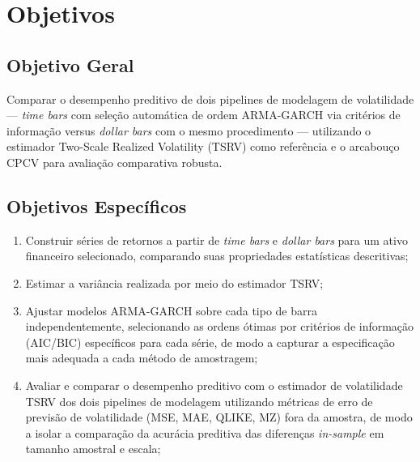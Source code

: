 \section{Objetivos}
\label{sec:objetivos}

\subsection{Objetivo Geral}
\label{subsec:objetivo_geral}

Comparar o desempenho preditivo de dois pipelines de modelagem de
volatilidade --- \emph{time bars} com seleção automática de ordem
ARMA-GARCH via critérios de informação versus \emph{dollar bars} com o
mesmo procedimento --- utilizando o estimador Two-Scale Realized
Volatility (TSRV) como referência e o arcabouço CPCV para avaliação
comparativa robusta.

\subsection{Objetivos Específicos}
\label{subsec:objetivos_especificos}

\begin{enumerate}
    \item Construir séries de retornos a partir de \emph{time bars} e
          \emph{dollar bars} para um ativo financeiro selecionado, comparando
          suas propriedades estatísticas descritivas;
    \item Estimar a variância realizada por meio do estimador TSRV;
    \item Ajustar modelos ARMA-GARCH sobre cada tipo de barra
          independentemente, selecionando as ordens ótimas por critérios de
          informação (AIC/BIC) específicos para cada série, de modo a
          capturar a especificação mais adequada a cada método de
          amostragem;
    \item Avaliar e comparar o desempenho preditivo com o estimador de volatilidade TSRV dos dois pipelines de
          modelagem utilizando métricas de erro de previsão de volatilidade
          (MSE, MAE, QLIKE, MZ) fora da amostra, de modo a isolar a
          comparação da acurácia preditiva das diferenças \emph{in-sample}
          em tamanho amostral e escala;
\end{enumerate}

